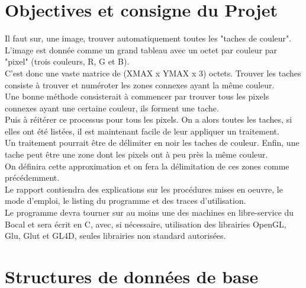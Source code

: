 \documentclass[12pt, letterpaper]{article}
\begin{document}
\section{Objectives et consigne du Projet}
Il faut sur, une image, trouver automatiquement toutes les "taches de couleur".\\
L'image est donnée comme un grand tableau avec un octet par couleur par "pixel" (trois couleurs, R, G et B).\\
C'est donc une vaste matrice de (XMAX x YMAX x 3) octets. Trouver les taches consiste à trouver et numéroter les zones connexes ayant la même couleur.\\
Une bonne méthode consisterait à commencer par trouver tous les pixels connexes ayant une certaine couleur, ils forment une tache.\\
Puis à réitérer ce processus pour tous les pixels. On a alors toutes les taches, si elles ont été listées, il est maintenant facile de leur appliquer un traitement.\\
Un traitement pourrait être de délimiter en noir les taches de couleur. Enfin, une tache peut être une zone dont les pixels ont à peu près la même couleur.\\
On définira cette approximation et on fera la délimitation de ces zones comme précédemment. \\
Le rapport contiendra des explications sur les procédures mises en oeuvre, le mode d'emploi, le listing du programme et des traces d'utilisation.\\
Le programme devra tourner sur au moins une des machines en libre-service du Bocal et sera écrit en C, avec, si nécessaire, 
utilisation des librairies OpenGL, Glu, Glut et GL4D, seules librairies non standard autorisées.

\section{Structures de données de base}
\end{document}
